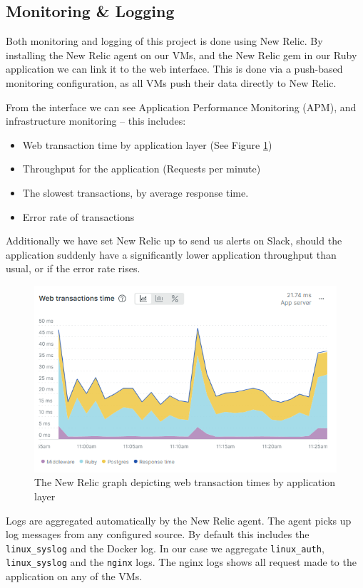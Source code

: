 \documentclass{article}
\begin{document}
\subsection{Monitoring \& Logging}
Both monitoring and logging of this project is done using New Relic. By installing the New Relic agent on our VMs, and the New Relic gem in our Ruby application we can link it to the web interface. This is done via a push-based monitoring configuration, as all VMs push their data directly to New Relic. 

From the interface we can see Application Performance Monitoring (APM), and infrastructure monitoring -- this includes:
\begin{itemize}
    \item Web transaction time by application layer (See Figure \ref{fig:transaction-times})
    \item Throughput for the application (Requests per minute) 
    \item The slowest transactions, by average response time.
    \item Error rate of transactions
\end{itemize}
Additionally we have set New Relic up to send us alerts on   Slack, should the application suddenly have a significantly lower application throughput than usual, or if the error rate rises.
\begin{figure}[H]
    \centering
    \includegraphics[width=\textwidth]{images/new-relic-transactions.png}
    \caption{The New Relic graph depicting web transaction times by application layer}
    \label{fig:transaction-times}
\end{figure}

Logs are aggregated automatically by the New Relic agent. The agent picks up log messages from any configured source. By default this includes the \texttt{linux\_syslog} and the Docker log. In our case we aggregate \texttt{linux\_auth}, \texttt{linux\_syslog} and the \texttt{nginx} logs. The nginx logs shows all request made to the application on any of the VMs.
\end{document}
